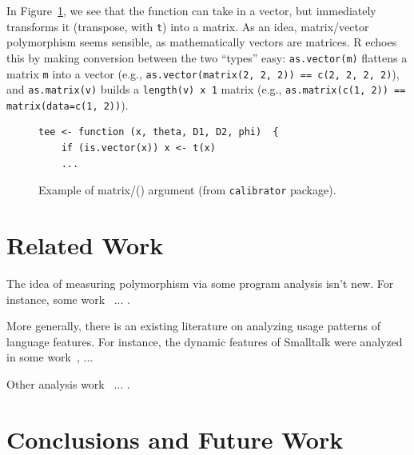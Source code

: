 \documentclass[acmsmall,10pt,review,anonymous]{acmart}\settopmatter{printfolios=true,printccs=false,printacmref=false}
\newcommand{\code}[1]{\lstinline|#1|\xspace}
\begin{document}
In Figure~\ref{fig:matvec}, we see that the function can take in a vector,
but immediately transforms it (transpose, with {\tt t}) into a matrix.  As
an idea, matrix/vector polymorphism seems sensible, as mathematically
vectors are matrices.  R echoes this by making conversion between the two
``types'' easy: \code{as.vector(m)} flattens a matrix \code{m} into a vector
(e.g., \code{as.vector(matrix(2, 2, 2)) == c(2, 2, 2, 2)}), and
\code{as.matrix(v)} builds a {\tt length(v) x 1} matrix (e.g.,
\code{as.matrix(c(1, 2)) == matrix(data=c(1, 2))}).  

\begin{figure}[!hb]{\small\begin{lstlisting}[style=R]
tee <- function (x, theta, D1, D2, phi)  {
    if (is.vector(x)) x <- t(x)
    ...
\end{lstlisting}}\caption{Example of matrix/(\D) argument (from {\tt calibrator} package).}\label{fig:matvec}\end{figure}

%
%
%
%
\section{Related Work}


The idea of measuring polymorphism via some program analysis isn't new.
For instance, some work~\cite{aakerblom2015measuring} ... .

More generally, there is an existing literature on analyzing usage patterns
of language features.  For instance, the dynamic features of Smalltalk were
analyzed in some work~\cite{callau2011howdevelopers}, ...

Other analysis work~\cite{milojkovic2017duck} ... .

\section{Conclusions and Future Work}



\end{document}
